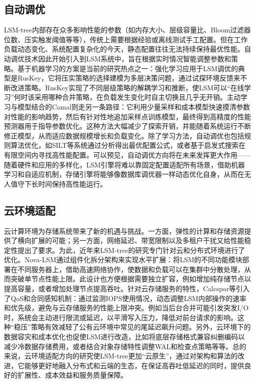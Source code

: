 \documentclass[lang=cn,11pt,a4paper]{elegantpaper}
\begin{document}
\subsection{自动调优}
LSM-tree内部存在众多影响性能的参数（如内存大小、层级容量比、Bloom过滤器位数、压实触发阈值等等），传统上需要根据经验或离线测试手工配置。但在工作负载动态变化、系统配置复杂化的今天，静态配置往往无法持续保持最优性能。自动调优技术因此开始引入到LSM系统中，旨在根据实时情况智能调整参数和策略。基于机器学习的方案是当前的研究热点之一：强化学习应用于LSM调优的典型是RusKey，它将压实策略的选择建模为多层决策问题，通过试探环境反馈来不断改进策略。RusKey实现了不同层级策略的解耦学习和推断，使LSM可以“在线学习”何时该采用哪种合并策略，在负载发生变化时自主切换且几乎无开销。主动学习与模型结合的Camal则走另一条路径：它利用少量采样和成本模型快速摸清参数对性能的影响趋势，然后有针对性地追加采样点训练模型，最终得到高精度的性能预测器用于指导参数优化。这种方法大幅减少了探索开销，并能随着系统运行不断修正模型，从而适应数据规模增长和负载变化。除了学习方法，自动调优也包括规则算法优化，如SILT等系统通过分析得出最优配置公式，或者基于启发式搜索在有限空间内寻找高性能配置。可以预见，自动调优方向将在未来发挥更大作用——随着硬件和应用的多样化，LSM引擎将难以靠固定配置适配所有场景，借助机器学习和自适应机制，存储引擎将能够像数据库调优器一样动态优化自身，从而在无人值守下长时间保持高性能运行。
\subsection{云环境适配}
云计算环境为存储系统带来了新的机遇与挑战。一方面，弹性的计算和存储资源提供了横向扩展的可能；另一方面，网络延迟、带宽限制以及多租户干扰又给性能稳定性提出了要求。为此，近年来LSM-tree的研究专门针对云和分布式环境进行了优化。Nova-LSM通过组件化拆分架构来实现水平扩展：将LSM的不同功能模块部署在不同服务器上，借助高速网络协作，使数据和负载可以在集群中分散处理，从而突破单节点性能上限。此设计也方便根据需要独立扩容，例如增加纯存储节点以提高容量，或者增加处理节点提高吞吐。针对云存储服务的特性，Calcspar等引入了QoS和合同感知机制：通过监测IOPS使用情况，动态调整LSM内部操作的速率和优先级，避免与云存储服务的性能上限冲突。例如当后台合并可能引发突发I/O时，系统会主动进行限流或延迟，以平滑写入压力，降低对前台请求的影响。这种“稳压”策略有效减轻了公有云环境中常见的尾延迟飙升问题。另外，云环境下的数据容灾和成本优化也促使LSM进行改造，比如将底层存储格式兼容纠删编码以减少冷数据存储费用，或者结合对象存储特性调整WAL和检查点策略等等。总的来说，云环境适配方向的研究使LSM-tree更加“云原生”，通过对架构和算法的改进，它能够更好地融入分布式和云端的生态，在保证高吞吐低延迟的同时，提供良好的扩展性、成本效益和服务质量保障。
\end{document}
